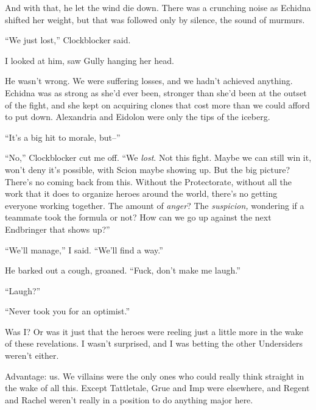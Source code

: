 And with that, he let the wind die down.  There was a crunching noise as Echidna shifted her weight, but that was followed only by silence, the sound of murmurs.



``We just lost,'' Clockblocker said.



I looked at him, saw Gully hanging her head.



He wasn't wrong.  We were suffering losses, and we hadn't achieved anything.  Echidna was as strong as she'd ever been, stronger than she'd been at the outset of the fight, and she kept on acquiring clones that cost more than we could afford to put down.  Alexandria and Eidolon were only the tips of the iceberg.



``It's a big hit to morale, but--''



``No,'' Clockblocker cut me off.  ``We \emph{lost}.  Not this fight.  Maybe we can still win it, won't deny it's possible, with Scion maybe showing up.  But the big picture?  There's no coming back from this.  Without the Protectorate, without all the work that it does to organize heroes around the world, there's no getting everyone working together.  The amount of \emph{anger}?  The \emph{suspicion, }wondering if a teammate took the formula or not?  How can we go up against the next Endbringer that shows up?''



``We'll manage,'' I said.  ``We'll find a way.''



He barked out a cough, groaned.  ``Fuck, don't make me laugh.''



``Laugh?''



``Never took you for an optimist.''



Was I?  Or was it just that the heroes were reeling just a little more in the wake of these revelations.  I wasn't surprised, and I was betting the other Undersiders weren't either.



Advantage: us.  We villains were the only ones who could really think straight in the wake of all this.  Except Tattletale, Grue and Imp were elsewhere, and Regent and Rachel weren't really in a position to do anything major here.



